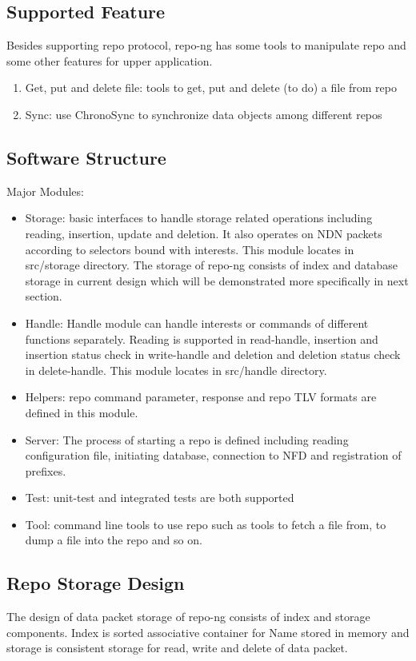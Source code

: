 \documentclass{acm_proc_article-sp}
\begin{document}
\subsection{Supported Feature}

Besides supporting repo protocol, repo-ng has some tools to manipulate repo and some other features for upper application.
\begin{enumerate}
\item Get, put and delete file: tools to get, put and delete (to do) a file from repo
\item Sync: use ChronoSync \cite{zhu2013let} to synchronize data objects among different repos
\end{enumerate}

\subsection{Software Structure}

Major Modules:
\begin{itemize}
\item Storage: basic interfaces to handle storage related operations including reading, insertion, update and deletion. It also operates on NDN packets according to selectors bound with interests. This module locates in src/storage directory. The storage of repo-ng consists of index and database storage in current design which will be demonstrated more specifically in next section.
\item Handle: Handle module can handle interests or commands of different functions separately. Reading is supported in read-handle, insertion and insertion status check in write-handle and deletion and deletion status check in delete-handle. This module locates in src/handle directory.
\item Helpers: repo command parameter, response and repo TLV formats are defined in this module.
\item Server: The process of starting a repo is defined  including reading configuration file, initiating database, connection to NFD and registration of prefixes.
\item Test: unit-test and integrated tests are both supported
\item Tool: command line tools to use repo such as tools to fetch a file from, to dump a file into the repo and so on.
\end{itemize}

\subsection{Repo Storage Design}
The design of data packet storage of repo-ng consists of index and storage components. Index is sorted associative container for Name stored in memory and storage is consistent storage for read, write and delete of data packet.
\end{document}
